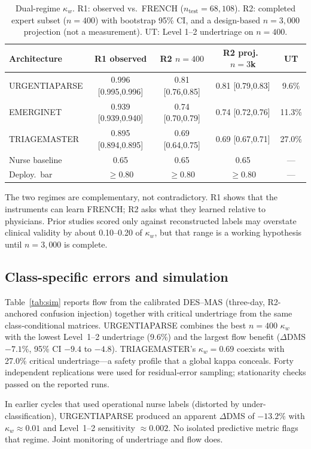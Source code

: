 \documentclass[conference]{IEEEtran}
\begin{document}
\begin{table}[!htbp]
\caption{Dual-regime $\kappa_w$. R1: observed vs.\ FRENCH ($n_{\mathrm{test}}=68{,}108$). R2: completed expert subset ($n=400$) with bootstrap 95\% CI, and a design-based $n=3{,}000$ projection (not a measurement). UT: Level 1--2 undertriage on $n=400$.}
\label{tab:dual}
\centering
\scriptsize
\setlength{\tabcolsep}{2.4pt}
\begin{tabular}{@{}lcccc@{}}
\toprule
Architecture & R1 observed & R2 $n{=}400$ & R2 proj.\ $n{=}3$k & UT \\
\midrule
URGENTIAPARSE & 0.996 [0.995,0.996] & 0.81 [0.76,0.85] & 0.81 [0.79,0.83] & 9.6\% \\
EMERGINET & 0.939 [0.939,0.940] & 0.74 [0.70,0.79] & 0.74 [0.72,0.76] & 11.3\% \\
TRIAGEMASTER & 0.895 [0.894,0.895] & 0.69 [0.64,0.75] & 0.69 [0.67,0.71] & 27.0\% \\
Nurse baseline & 0.65 & 0.65 & 0.65 & --- \\
Deploy.\ bar & $\geq0.80$ & $\geq0.80$ & $\geq0.80$ & --- \\
\bottomrule
\end{tabular}
\end{table}

The two regimes are complementary, not contradictory. R1 shows that the instruments can learn FRENCH; R2 asks what they learned relative to physicians. Prior studies scored only against reconstructed labels may overstate clinical validity by about 0.10--0.20 of $\kappa_w$, but that range is a working hypothesis until $n=3{,}000$ is complete.

\subsection{Class-specific errors and simulation}
Table~\ref{tab:sim} reports flow from the calibrated DES--MAS (three-day, R2-anchored confusion injection) together with critical undertriage from the same class-conditional matrices. URGENTIAPARSE combines the best $n=400$ $\kappa_w$ with the lowest Level~1--2 undertriage (9.6\%) and the largest flow benefit ($\Delta$DMS $-7.1\%$, 95\% CI $-9.4$ to $-4.8$). TRIAGEMASTER's $\kappa_w=0.69$ coexists with 27.0\% critical undertriage---a safety profile that a global kappa conceals. Forty independent replications were used for residual-error sampling; stationarity checks passed on the reported runs.

In earlier cycles that used operational nurse labels (distorted by under-classification), URGENTIAPARSE produced an apparent $\Delta$DMS of $-13.2\%$ with $\kappa_w\approx0.01$ and Level~1--2 sensitivity $\approx0.002$. No isolated predictive metric flags that regime. Joint monitoring of undertriage and flow does.
\end{document}
